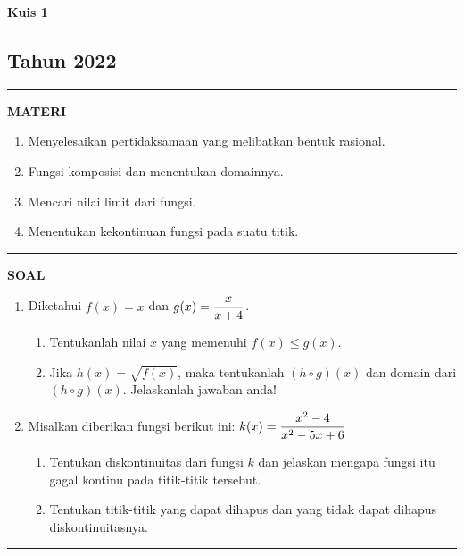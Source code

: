 \begin{flushright}
    \textbf{\Large{Kuis 1}}
    \subsection*{Tahun 2022}
\end{flushright}
\vspace{0.5cm}
\hrule height 2pt
\vspace{0.5cm}
\begin{center}
    \textbf{\large{MATERI}}
    \begin{enumerate}[leftmargin=*, label={\arabic*}.]
        \item Menyelesaikan pertidaksamaan yang melibatkan bentuk rasional.
        \item Fungsi komposisi dan menentukan domainnya.
        \item Mencari nilai limit dari fungsi.
        \item Menentukan kekontinuan fungsi pada suatu titik.
    \end{enumerate}
\end{center}
\vspace{0.2cm}
\hrule height 1pt
\vspace{0.5cm}
\begin{center}
    \textbf{\large{SOAL}}
\end{center}
\begin{enumerate}[leftmargin=*, label={\arabic*}.]
\item Diketahui $f(x) = x$ dan $\displaystyle g(x) = \frac{x}{x+4}$.
\begin{enumerate}[label={\alph*}.]
    \item Tentukanlah nilai $x$ yang memenuhi $f(x) \leq g(x)$.
    \item Jika $h(x) = \sqrt{f(x)}$, maka tentukanlah $(h \circ g)(x)$ 
    dan domain dari $(h \circ g)(x)$. Jelaskanlah jawaban anda!
\end{enumerate}
\item Misalkan diberikan fungsi berikut ini: 
$\displaystyle k(x) = \frac{x^{2}-4}{x^{2}-5x+6}$
\begin{enumerate}[label={\alph*}.]
    \item Tentukan diskontinuitas dari fungsi $k$ dan jelaskan mengapa fungsi
    itu gagal kontinu pada titik-titik tersebut.
    \item Tentukan titik-titik yang dapat dihapus dan yang tidak dapat dihapus
    diskontinuitasnya.
\end{enumerate}
\end{enumerate}
\vspace{0.2cm}
\hrule height 1pt
\vspace{0.5cm}

